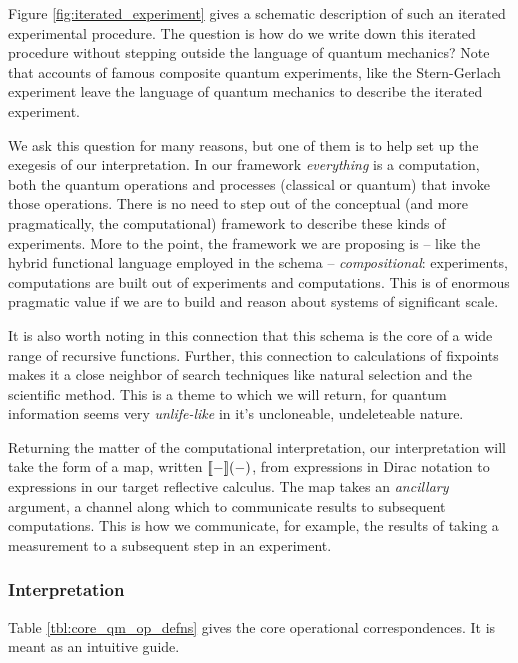Figure \ref{fig:iterated_experiment} gives a schematic description of
such an iterated experimental procedure. The question is how do we
write down this iterated procedure without stepping outside the
language of quantum mechanics? Note that accounts of famous composite
quantum experiments, like the Stern-Gerlach experiment leave the
language of quantum mechanics to describe the iterated experiment.

We ask this question for many reasons, but one of them is to help set
up the exegesis of our interpretation. In our framework
\emph{everything} is a computation, both the quantum operations and
processes (classical or quantum) that invoke those operations. There
is no need to step out of the conceptual (and more pragmatically, the
computational) framework to describe these kinds of experiments. More
to the point, the framework we are proposing is -- like the hybrid
functional language employed in the schema -- \emph{compositional}:
experiments, computations are built out of experiments and
computations. This is of enormous pragmatic value if we are to build
and reason about systems of significant scale.

\begin{remark}
  It is also worth noting in this connection that this schema is the
  core of a wide range of recursive functions. Further, this
  connection to calculations of fixpoints makes it a close neighbor of
  search techniques like natural selection and the scientific
  method. This is a theme to which we will return, for quantum
  information seems very \emph{unlife-like} in it's uncloneable,
  undeleteable nature.
\end{remark}

Returning the matter of the computational interpretation, our
interpretation will take the form of a map, written
$[\![ - ]\!](-)$, from expressions in Dirac notation to expressions
in our target reflective calculus. The map takes an \emph{ancillary}
argument, a channel along which to communicate results to subsequent
computations. This is how we communicate, for example, the results of
taking a measurement to a subsequent step in an experiment.

\subsubsection{Interpretation}

Table \ref{tbl:core_qm_op_defns} gives the core operational
correspondences. It is meant as an intuitive guide.

